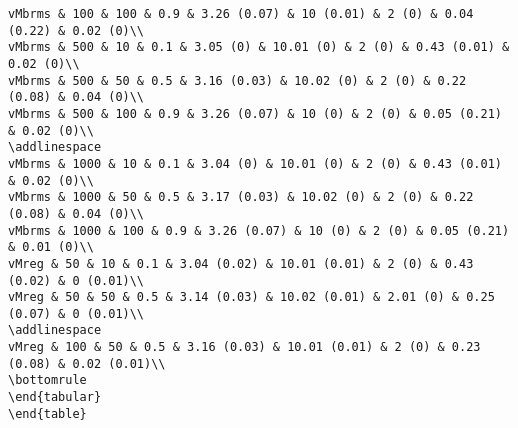 \documentclass[
]{article}
\begin{document}
\begin{verbatim}
vMbrms & 100 & 100 & 0.9 & 3.26 (0.07) & 10 (0.01) & 2 (0) & 0.04 (0.22) & 0.02 (0)\\
vMbrms & 500 & 10 & 0.1 & 3.05 (0) & 10.01 (0) & 2 (0) & 0.43 (0.01) & 0.02 (0)\\
vMbrms & 500 & 50 & 0.5 & 3.16 (0.03) & 10.02 (0) & 2 (0) & 0.22 (0.08) & 0.04 (0)\\
vMbrms & 500 & 100 & 0.9 & 3.26 (0.07) & 10 (0) & 2 (0) & 0.05 (0.21) & 0.02 (0)\\
\addlinespace
vMbrms & 1000 & 10 & 0.1 & 3.04 (0) & 10.01 (0) & 2 (0) & 0.43 (0.01) & 0.02 (0)\\
vMbrms & 1000 & 50 & 0.5 & 3.17 (0.03) & 10.02 (0) & 2 (0) & 0.22 (0.08) & 0.04 (0)\\
vMbrms & 1000 & 100 & 0.9 & 3.26 (0.07) & 10 (0) & 2 (0) & 0.05 (0.21) & 0.01 (0)\\
vMreg & 50 & 10 & 0.1 & 3.04 (0.02) & 10.01 (0.01) & 2 (0) & 0.43 (0.02) & 0 (0.01)\\
vMreg & 50 & 50 & 0.5 & 3.14 (0.03) & 10.02 (0.01) & 2.01 (0) & 0.25 (0.07) & 0 (0.01)\\
\addlinespace
vMreg & 100 & 50 & 0.5 & 3.16 (0.03) & 10.01 (0.01) & 2 (0) & 0.23 (0.08) & 0.02 (0.01)\\
\bottomrule
\end{tabular}
\end{table}
\end{verbatim}
\end{document}
